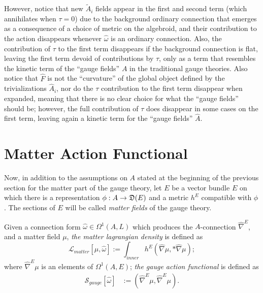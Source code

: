 However, notice that new $\tilde A_i$ fields appear in the first and second term (which annihilates when $\tau = 0$) due to the background ordinary connection that emerges as a consequence of a choice of metric on the algebroid, and their contribution to the action disappears whenever $\hat \omega$ is an ordinary connection. Also, the contribution of $\tau$ to the first term disappears if the background connection is flat, leaving the first term devoid of contributions by $\tau$, only as a term that resembles the kinetic term of the ``gauge fields'' $A$ in the traditional gauge theories. Also notice that $\hat F$ is not the ``curvature'' of the global object defined by the trivializations $\hat A_i$, nor do the $\tau$ contribution to the first term disappear when expanded, meaning that there is no clear choice for what the ``gauge fields'' should be; however, the full contribution of $\tau$ does disappear in some cases on the first term, leaving again a kinetic term for the ``gauge fields'' $\hat A$.

\section{Matter Action Functional}
\label{chGaugeSectionMatterAction}

Now, in addition to the assumptions on $A$ stated at the beginning of the previous section for the matter part of the gauge theory, let $E$ be a vector bundle $E$ on which there is a representation $\phi: A \to \alg D(E)$ and a metric $h^E$ compatible with $\phi$. The sections of $E$ will be called \emph{matter fields} of the gauge theory.

\begin{definition}\label{definitionMatterActionLagrangian}
Given a connection form $\hat \omega \in \Omega^1(A, L)$ which produces the $A$-connection $\hat \nabla^E$, and a matter field $\mu$, \emph{the matter lagrangian density} is defined as
\begin{equation}
    \mathcal L_{matter}[\mu, \hat \omega] := \int_{inner} h^E(\hat \nabla \mu, *\hat \nabla \mu);
\end{equation}
where $\hat \nabla^E \mu$ is an elements of $\Omega^1(A,E)$; \emph{the gauge action functional} is defined as 
\begin{align}
    \mathcal S_{gauge}[\hat \omega]& := (\hat \nabla^E \mu, \hat \nabla^E \mu).
\end{align}
\end{definition}


